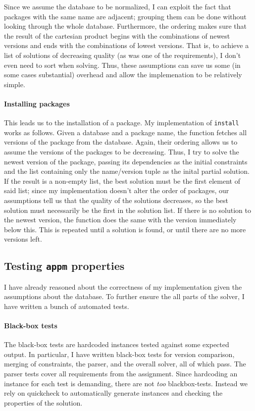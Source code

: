 Since we assume the database to be normalized, I can exploit the fact that packages with the same name are adjacent; grouping them can be done without looking through the whole database. Furthermore, the ordering makes sure that the result of the cartesian product begins with the combinations of newest versions and ends with the combinations of lowest versions. That is, to achieve a list of solutions of decreasing quality (as was one of the requirements), I don't even need to sort when solving. Thus, these assumptions can save us some (in some cases substantial) overhead and allow the implemenation to be relatively simple.


\paragraph{Installing packages}
This leads us to the installation of a package. My implementation of \texttt{install} works as follows. Given a database and a package name, the function fetches all versions of the package from the database. Again, their ordering allows us to assume the versions of the packages to be decreasing. Thus, I try to solve the newest version of the package, passing its dependencies as the initial constraints and the list containing only the name/version tuple as the inital partial solution. If the result is a non-empty list, the best solution must be the first element of said list; since my implementation doesn't alter the order of packages, our assumptions tell us that the quality of the solutions decreases, so the best solution must necessarily be the first in the solution list. If there is no solution to the newest version, the function does the same with the version immediately below this. This is repeated until a solution is found, or until there are no more versions left.


\subsection*{Testing \texttt{appm} properties}
I have already reasoned about the correctness of my implementation given the assumptions about the database. To further ensure the all parts of the solver, I have written a bunch of automated tests.

\paragraph{Black-box tests}
The black-box tests are hardcoded instances tested against some expected output. In particular, I have written black-box tests for version comparison, merging of constraints, the parser, and the overall solver, all of which pass. The parser tests cover all requirements from the assignment. Since hardcoding an instance for each test is demanding, there are not \textit{too} blackbox-tests. Instead we rely on quickcheck to automatically generate instances and checking the properties of the solution.

